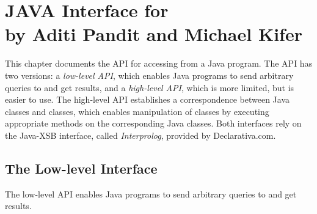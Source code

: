 

\chapter[JAVA Interface for \FLSYSTEM]{JAVA Interface for \FLSYSTEM\\by Aditi
      Pandit and Michael Kifer}


     This chapter documents the API for accessing \FLSYSTEM from a Java program.
  The API has two versions: a \emph{low-level API},
  which enables Java programs to
  send arbitrary queries to \FLSYSTEM and get results, and a \emph{high-level
    API}, which is more limited, but is easier to use. The high-level API
  establishes a correspondence between Java classes and \FLSYSTEM classes,
  which enables manipulation of \FLSYSTEM classes by executing appropriate
  methods on the corresponding Java classes. Both interfaces rely on the
  Java-XSB interface, called \emph{Interprolog}, provided by Declarativa.com.


\section{The Low-level Interface}
 The low-level API enables Java programs to send arbitrary queries
to \FLSYSTEM and get results. 

